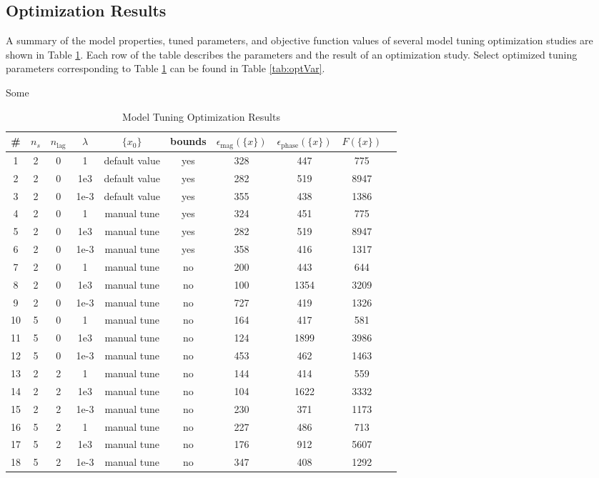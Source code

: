 \subsection{Optimization Results} %

A summary of the model properties, tuned parameters, and objective function values of several model tuning optimization studies are shown in Table \ref{tab:optResult}. Each row of the table describes the parameters and the result of an optimization study. Select optimized tuning parameters corresponding to Table \ref{tab:optResult} can be found in Table \ref{tab:optVar}.

Some 
\begin{landscape}

\begin{table}[H]
	\centering
	\caption{Model Tuning Optimization Results}
	\label{tab:optResult}
	\begin{tabular}{cccccccccc}
		\hline\hline
		\# & $n_s$ & $n_\text{lag}$ & $\lambda$ & $\{x_0\}$ & bounds & $\epsilon_\text{mag}(\{x\})$ & $\epsilon_\text{phase}(\{x\})$ & $F(\{x\})$ \\
		\hline
		1  & 2 & 0 & 1    & default value & yes & 328 & 447  & 775 \\
		2  & 2 & 0 & 1e3  & default value & yes & 282 & 519  & 8947 \\
		3  & 2 & 0 & 1e-3 & default value & yes & 355 & 438  & 1386 \\
		4  & 2 & 0 & 1    & manual tune   & yes & 324 & 451  & 775 \\
		5  & 2 & 0 & 1e3  & manual tune   & yes & 282 & 519  & 8947 \\
		6  & 2 & 0 & 1e-3 & manual tune   & yes & 358 & 416  & 1317 \\
		7  & 2 & 0 & 1    & manual tune   & no  & 200 & 443  & 644 \\
		8  & 2 & 0 & 1e3  & manual tune   & no  & 100 & 1354 & 3209 \\
		9  & 2 & 0 & 1e-3 & manual tune   & no  & 727 & 419  & 1326 \\
		10 & 5 & 0 & 1    & manual tune   & no  & 164 & 417  & 581 \\
		11 & 5 & 0 & 1e3  & manual tune   & no  & 124 & 1899 & 3986 \\
		12 & 5 & 0 & 1e-3 & manual tune   & no  & 453 & 462  & 1463 \\
		13 & 2 & 2 & 1    & manual tune   & no  & 144 & 414  & 559 \\
		14 & 2 & 2 & 1e3  & manual tune   & no  & 104 & 1622 & 3332 \\
		15 & 2 & 2 & 1e-3 & manual tune   & no  & 230 & 371  & 1173 \\
		16 & 5 & 2 & 1    & manual tune   & no  & 227 & 486  & 713 \\
		17 & 5 & 2 & 1e3  & manual tune   & no  & 176 & 912  & 5607 \\
		18 & 5 & 2 & 1e-3 & manual tune   & no  & 347 & 408  & 1292 \\
		\hline\hline
	\end{tabular}
\end{table}


\end{landscape}
